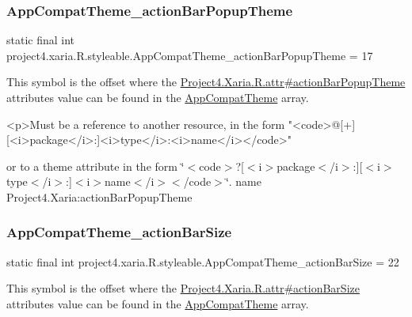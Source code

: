 \subsubsection{\texorpdfstring{App\+Compat\+Theme\+\_\+action\+Bar\+Popup\+Theme}{AppCompatTheme\_actionBarPopupTheme}}
{\footnotesize\ttfamily static final int project4.\+xaria.\+R.\+styleable.\+App\+Compat\+Theme\+\_\+action\+Bar\+Popup\+Theme = 17\hspace{0.3cm}{\ttfamily [static]}}

This symbol is the offset where the \hyperlink{}{Project4.\+Xaria.\+R.\+attr\#action\+Bar\+Popup\+Theme} attribute\textquotesingle{}s value can be found in the \hyperlink{classproject4_1_1xaria_1_1R_1_1styleable_aad8bec413e2350f9404e6ff0e831a85d}{App\+Compat\+Theme} array.

\begin{DoxyVerb}      <p>Must be a reference to another resource, in the form "<code>@[+][<i>package</i>:]<i>type</i>:<i>name</i></code>"
\end{DoxyVerb}
 or to a theme attribute in the form \char`\"{}$<$code$>$?\mbox{[}$<$i$>$package$<$/i$>$\+:\mbox{]}\mbox{[}$<$i$>$type$<$/i$>$\+:\mbox{]}$<$i$>$name$<$/i$>$$<$/code$>$\char`\"{}.  name Project4.\+Xaria\+:action\+Bar\+Popup\+Theme \mbox{\label{classproject4_1_1xaria_1_1R_1_1styleable_ab4089eb2d0e03e7fe09ecada776ec627}} 
\subsubsection{\texorpdfstring{App\+Compat\+Theme\+\_\+action\+Bar\+Size}{AppCompatTheme\_actionBarSize}}
{\footnotesize\ttfamily static final int project4.\+xaria.\+R.\+styleable.\+App\+Compat\+Theme\+\_\+action\+Bar\+Size = 22\hspace{0.3cm}{\ttfamily [static]}}

This symbol is the offset where the \hyperlink{}{Project4.\+Xaria.\+R.\+attr\#action\+Bar\+Size} attribute\textquotesingle{}s value can be found in the \hyperlink{classproject4_1_1xaria_1_1R_1_1styleable_aad8bec413e2350f9404e6ff0e831a85d}{App\+Compat\+Theme} array.

